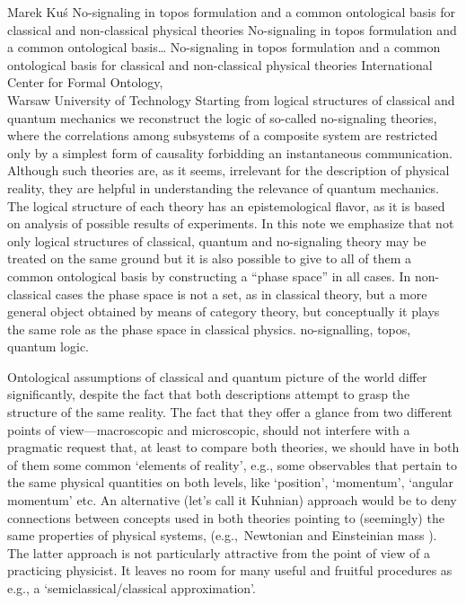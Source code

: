 \begin{artengenv}{Marek Ku\'s}
	{No-signaling in topos formulation and a common ontological basis for classical and non-classical physical theories}
	{No-signaling in topos formulation and a common ontological basis\ldots}
	{No-signaling in topos formulation and a common ontological basis for classical and non-classical physical theories}
	{International Center for Formal Ontology,\\
	Warsaw University of Technology}
	{Starting from logical structures of classical and quantum mechanics we reconstruct the logic of so-called no-signaling theories, where the correlations among subsystems of a composite system are restricted only by a simplest form of causality forbidding an instantaneous communication. Although such theories are, as it seems, irrelevant for the description of physical reality, they are helpful in understanding the relevance of quantum mechanics. The logical structure of each theory has an epistemological flavor, as it is based on analysis of possible results of experiments. In this note we emphasize that not only logical structures of classical, quantum and no-signaling theory may be treated on the same ground but it is also possible to give to all of them a common ontological basis by constructing a ``phase space'' in all cases. In non-classical cases the phase space is not a set, as in classical theory, but a more general object obtained by means of category theory, but conceptually it plays the same role as the phase space in classical physics.}
	{no-signalling, topos, quantum logic.}




\lettrine[loversize=0.13,lines=2,lraise=-0.03,nindent=0em,findent=0.2pt]%
{O}{}ntological assumptions of classical and quantum picture of the world differ significantly, despite the fact that both descriptions attempt to grasp the structure of the same reality. The fact that they offer a glance from two different points of view---macroscopic and microscopic, should not interfere with a pragmatic request that, at least to compare both theories, we should have in both of them some common `elements of reality', e.g., some observables that pertain to the same physical quantities on both levels, like `position', `momentum', `angular momentum' etc. An alternative (let's call it Kuhnian) approach would be to deny connections between concepts used in both theories pointing to (seemingly) the same properties of physical systems, (e.g.,\ Newtonian and Einsteinian mass \parencite{kuhn_structure_1970}). The latter approach is not particularly attractive from the point of view of a practicing physicist. It leaves no room for many useful and fruitful procedures as e.g., a `semiclassical/classical approximation'.


\end{artengenv}
